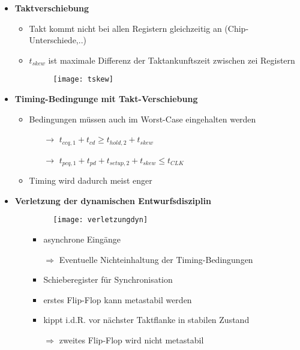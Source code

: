 \begin{itemize}
\pagebreak	
	
\item \textbf{Taktverschiebung}
	\begin{itemize}
	\item Takt kommt nicht bei allen Registern gleichzeitig an (Chip-Unterschiede,..)
	\item $t_{skew}$ ist maximale Differenz der Taktankunftszeit zwischen zei Registern
	\item[] \begin{figure}[H]
				\begin{center}
				\texttt{[image: tskew]}
				\end{center}
			\end{figure}
	\end{itemize}
	
\item \textbf{Timing-Bedingunge mit Takt-Verschiebung}
	\begin{itemize}
	\item Bedingungen müssen auch im Worst-Case eingehalten werden
		\begin{itemize}
		\item[$\rightarrow$] $t_{ccq,1}+t_{cd} \geq t_{hold,2} + t_{skew}$
		\item[$\rightarrow$] $t_{pcq,1}+t_{pd} + t_{setup,2} + t_{skew} \leq t_{CLK}$
		\end{itemize}
	
	\item Timing wird dadurch meist enger
	\end{itemize}
	
\item \textbf{Verletzung der dynamischen Entwurfsdisziplin}
	\begin{itemize}
	\item[]		
				\begin{minipage}{0.25\textwidth}
					\begin{figure}[H]
					\texttt{[image: verletzungdyn]}
					\end{figure}
				\end{minipage}
				\begin{minipage}[t]{0.65\textwidth}
					\vspace{-1.5cm}
					\begin{itemize}
					\item asynchrone Eingänge 
					\item[$\Rightarrow$]Eventuelle Nichteinhaltung der Timing-Bedingungen
					\item Schieberegister für Synchronisation
					\item erstes Flip-Flop kann metastabil werden
					\item kippt i.d.R. vor nächster Taktflanke in stabilen Zustand
					\item[$\Rightarrow$] zweites Flip-Flop wird nicht metastabil
					\end{itemize}
				\end{minipage}
	

	\end{itemize}
	
\end{itemize}


